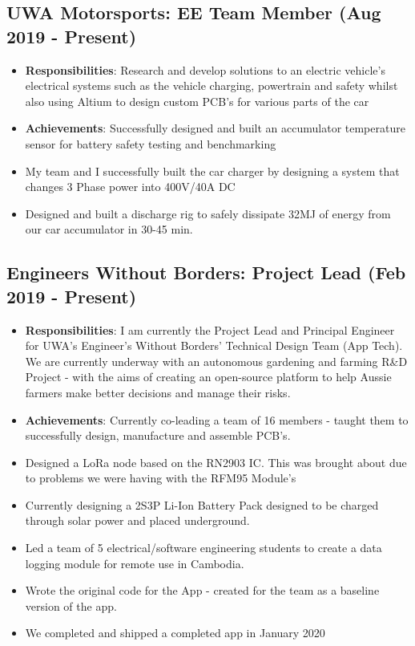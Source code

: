 \documentclass{article}[a4page]
\begin{document}
\subsection*{UWA Motorsports: EE Team Member \hfill (Aug 2019 - Present)}
\begin{itemize}
\item \textbf{Responsibilities}: Research and develop solutions to an electric vehicle’s electrical systems such as the vehicle charging, powertrain and safety whilst also using Altium to design custom PCB’s for various parts of the car
\item \textbf{Achievements}: Successfully designed and built an accumulator temperature sensor for battery safety testing and benchmarking
\item My team and I successfully built the car charger by designing a system that changes 3 Phase power into 400V/40A DC
\item Designed and built a discharge rig to safely dissipate 32MJ of energy from our car accumulator in 30-45 min.
\end{itemize}

\subsection*{Engineers Without Borders: Project Lead \hfill (Feb 2019 - Present)}
\begin{itemize}
\item \textbf{Responsibilities}: I am currently the Project Lead and Principal Engineer for UWA's Engineer's Without Borders' Technical Design Team (App Tech). We are currently underway with an autonomous gardening and farming R\&D Project - with the aims of creating an open-source platform to help Aussie farmers make better decisions and manage their risks. 
\item \textbf{Achievements}: Currently co-leading a team of 16 members - taught them to successfully design, manufacture and assemble PCB's. 
\item Designed a LoRa node based on the RN2903 IC. This was brought about due to problems we were having with the RFM95 Module's
\item Currently designing a 2S3P Li-Ion Battery Pack designed to be charged through solar power and placed underground.
\item Led a team of 5 electrical/software engineering students to create a data logging module for remote use in Cambodia.
\item Wrote the original code for the App - created for the team as a baseline version of the app. 
\item We completed and shipped a completed app in January 2020
\end{itemize}
\end{document}
